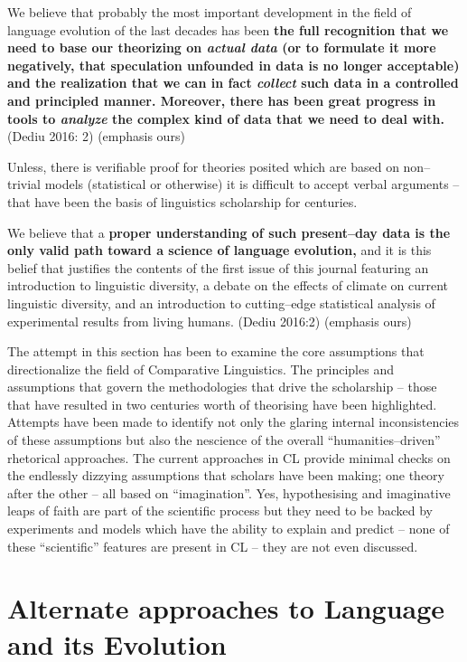 \begin{myquote}
We believe that probably the most important development in the field of language evolution of the last decades has been \textbf{the full recognition that we need to base our theorizing on \textit{actual data} (or to formulate it more negatively, that speculation unfounded in data is no longer acceptable) and the realization that we can in fact \textit{collect} such data in a controlled and principled manner. Moreover, there has been great progress in tools to \textit{analyze} the complex kind of data that we need to deal with.} (Dediu 2016: 2) (emphasis ours)
\end{myquote}

Unless, there is verifiable proof for theories posited which are based on non–trivial models (statistical or otherwise) it is difficult to accept verbal arguments – that have been the basis of linguistics scholarship for centuries.

\begin{myquote}
We believe that a \textbf{proper understanding of such present–day data is the only valid path toward a science of language evolution,} and it is this belief that justifies the contents of the first issue of this journal featuring an introduction to linguistic diversity, a debate on the effects of climate on current linguistic diversity, and an introduction to cutting–edge statistical analysis of experimental results from living humans. (Dediu 2016:2) (emphasis ours)
\end{myquote}

The attempt in this section has been to examine the core assumptions that directionalize the field of Comparative Linguistics. The principles and assumptions that govern the methodologies that drive the scholarship – those that have resulted in two centuries worth of theorising have been highlighted. Attempts have been made to identify not only the glaring internal inconsistencies of these assumptions but also the nescience of the overall “humanities–driven” rhetorical approaches. The current approaches in CL provide minimal checks on the endlessly dizzying assumptions that scholars have been making; one theory after the other – all based on “imagination”. Yes, hypothesising and imaginative leaps of faith are part of the scientific process but they need to be backed by experiments and models which have the ability to explain and predict – none of these “scientific” features are present in CL – they are not even discussed.


\section*{Alternate approaches to Language and its Evolution}

